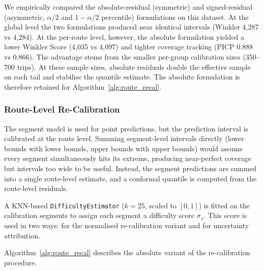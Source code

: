 \documentclass[12pt, a4paper, oneside]{report}
\begin{document}
We empirically compared the absolute-residual (symmetric) and signed-residual (asymmetric, $\alpha/2$ and $1-\alpha/2$ percentile) formulations on this dataset. At the global level the two formulations produced near identical intervals (Winkler 4{,}287 vs 4{,}284). At the per-route level, however, the absolute formulation yielded a lower Winkler Score (4{,}035 vs 4{,}097) and tighter coverage tracking (PICP 0.888 vs 0.866). The advantage stems from the smaller per-group calibration sizes (350--700 trips). At these sample sizes, absolute residuals double the effective sample on each tail and stabilise the quantile estimate. The absolute formulation is therefore retained for Algorithm~\ref{alg:route_recal}.

\subsubsection{Route-Level Re-Calibration}

The segment model is used for point predictions, but the prediction interval is calibrated at the route level. Summing segment-level intervals directly (lower bounds with lower bounds, upper bounds with upper bounds) would assume every segment simultaneously hits its extreme, producing near-perfect coverage but intervals too wide to be useful. Instead, the segment predictions are summed into a single route-level estimate, and a conformal quantile is computed from the route-level residuals.

A KNN-based \texttt{DifficultyEstimator} ($k=25$, scaled to $[0,1]$) is fitted on the calibration segments to assign each segment a difficulty score $\sigma_s$. This score is used in two ways: for the normalised re-calibration variant and for uncertainty attribution.

Algorithm~\ref{alg:route_recal} describes the absolute variant of the re-calibration procedure.
\end{document}

